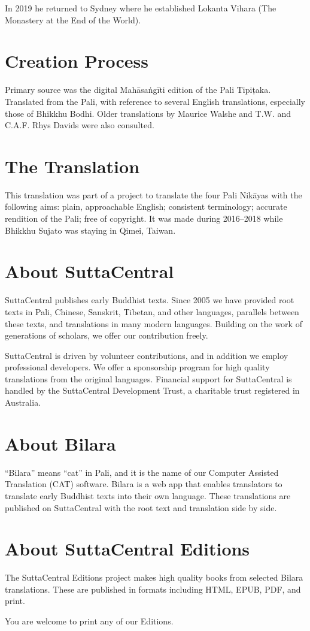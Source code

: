 \documentclass[12pt,openany]{book}%
\begin{document}
In 2019 he returned to Sydney where he established Lokanta Vihara (The Monastery at the End of the World). 

\section*{Creation Process}

Primary source was the digital \textsanskrit{Mahāsaṅgīti} edition of the Pali \textsanskrit{Tipiṭaka}. Translated from the Pali, with reference to several English translations, especially those of Bhikkhu Bodhi. Older translations by Maurice Walshe and T.W. and C.A.F. Rhys Davids were also consulted.

\section*{The Translation}

This translation was part of a project to translate the four Pali \textsanskrit{Nikāyas} with the following aims: plain, approachable English; consistent terminology; accurate rendition of the Pali; free of copyright. It was made during 2016–2018 while Bhikkhu Sujato was staying in Qimei, Taiwan.

\section*{About SuttaCentral}

SuttaCentral publishes early Buddhist texts. Since 2005 we have provided root texts in Pali, Chinese, Sanskrit, Tibetan, and other languages, parallels between these texts, and translations in many modern languages. Building on the work of generations of scholars, we offer our contribution freely.

SuttaCentral is driven by volunteer contributions, and in addition we employ professional developers. We offer a sponsorship program for high quality translations from the original languages. Financial support for SuttaCentral is handled by the SuttaCentral Development Trust, a charitable trust registered in Australia.

\section*{About Bilara}

“Bilara” means “cat” in Pali, and it is the name of our Computer Assisted Translation (CAT) software. Bilara is a web app that enables translators to translate early Buddhist texts into their own language. These translations are published on SuttaCentral with the root text and translation side by side.

\section*{About SuttaCentral Editions}

The SuttaCentral Editions project makes high quality books from selected Bilara translations. These are published in formats including HTML, EPUB, PDF, and print.

You are welcome to print any of our Editions.

%
\end{document}
